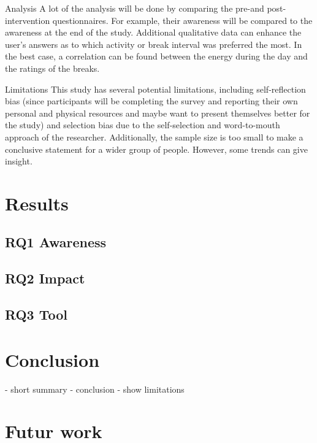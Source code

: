 \documentclass{hasel_thesis}
\begin{document}
	
Analysis
A lot of the analysis will be done by comparing the pre-and post-intervention questionnaires. For example, their awareness will be compared to the awareness at the end of the study. Additional qualitative data can enhance the user's answers as to which activity or break interval was preferred the most. In the best case, a correlation can be found between the energy during the day and the ratings of the breaks. 
 
Limitations 
This study has several potential limitations, including self-reflection bias (since participants will be completing the survey and reporting their own personal and physical resources and maybe want to present themselves better for the study) and selection bias due to the self-selection and word-to-mouth approach of the researcher. Additionally, the sample size is too small to make a conclusive statement for a wider group of people. However, some trends can give insight.

\chapter{Results}
\begin{comment} 
Summary of the findings from the study, including any significant effects of the recharge breaks on personal resource recharge
\end{comment}

\section{RQ1 Awareness}
\section{RQ2 Impact}
\section{RQ3 Tool}


  

\chapter{Conclusion}
%
- short summary
- conclusion
    - show limitations

\chapter{Futur work}
\end{document}
